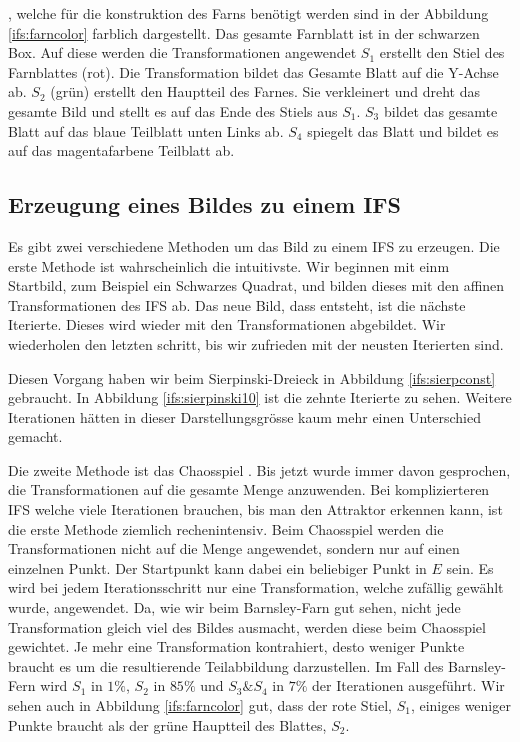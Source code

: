 , welche für die konstruktion des Farns benötigt werden sind in der Abbildung \ref{ifs:farncolor} farblich dargestellt.
Das gesamte Farnblatt ist in der schwarzen Box.
Auf diese werden die Transformationen angewendet
$S_1$ erstellt den Stiel des Farnblattes (rot).
Die Transformation bildet das Gesamte Blatt auf die Y-Achse ab.
$S_2$ (grün) erstellt den Hauptteil des Farnes. 
Sie verkleinert und dreht das gesamte Bild und stellt es auf das Ende des Stiels aus $S_1$.
$S_3$ bildet das gesamte Blatt auf das blaue Teilblatt unten Links ab.
$S_4$ spiegelt das Blatt und bildet es auf das magentafarbene Teilblatt ab.  
\subsection{Erzeugung eines Bildes zu einem IFS}
Es gibt zwei verschiedene Methoden um das Bild zu einem IFS zu erzeugen.
Die erste Methode ist wahrscheinlich die intuitivste. 
Wir beginnen mit einm Startbild, zum Beispiel ein Schwarzes Quadrat, und bilden dieses mit den affinen Transformationen des IFS ab.
Das neue Bild, dass entsteht, ist die nächste Iterierte.
Dieses wird wieder mit den Transformationen abgebildet.
Wir wiederholen den letzten schritt, bis wir zufrieden mit der neusten Iterierten sind.

Diesen Vorgang haben wir beim Sierpinski-Dreieck in Abbildung \ref{ifs:sierpconst} gebraucht.
In Abbildung \ref{ifs:sierpinski10} ist die zehnte Iterierte zu sehen.
Weitere Iterationen hätten in dieser Darstellungsgrösse kaum mehr einen Unterschied gemacht.


Die zweite Methode ist das Chaosspiel \cite{ifs:chaos}. 
Bis jetzt wurde immer davon gesprochen, die Transformationen auf die gesamte Menge anzuwenden.
Bei komplizierteren IFS welche viele Iterationen brauchen, bis man den Attraktor erkennen kann, ist die erste Methode ziemlich rechenintensiv.
Beim Chaosspiel werden die Transformationen nicht auf die Menge angewendet, sondern nur auf einen einzelnen Punkt.
Der Startpunkt kann dabei ein beliebiger Punkt in $E$ sein.
Es wird bei jedem Iterationsschritt nur eine Transformation, welche zufällig gewählt wurde, angewendet.
Da, wie wir beim Barnsley-Farn gut sehen, nicht jede Transformation gleich viel des Bildes ausmacht, werden diese beim Chaosspiel gewichtet.
Je mehr eine Transformation kontrahiert, desto weniger Punkte braucht es um die resultierende Teilabbildung darzustellen.
Im Fall des Barnsley-Fern wird $S_1$ in $1\%$, $S_2$ in $85\%$ und $S_3 \& S_4$ in $7\%$ der Iterationen ausgeführt.
Wir sehen auch in Abbildung \ref{ifs:farncolor} gut, dass der rote Stiel, $S_1$, einiges weniger Punkte braucht als der grüne Hauptteil des Blattes, $S_2$.

